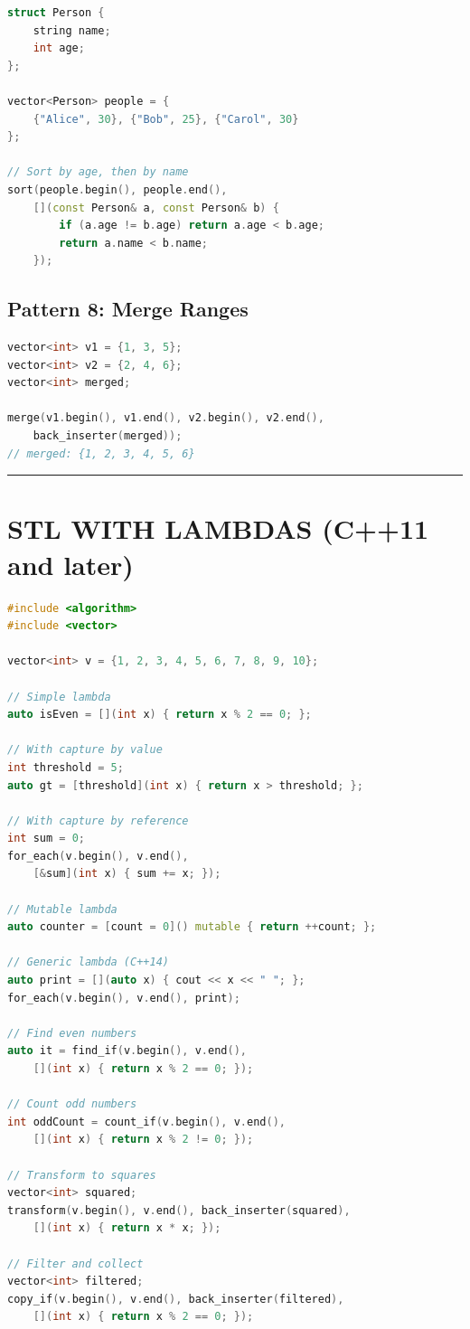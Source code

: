 \begin{lstlisting}[language={C++}]
struct Person {
    string name;
    int age;
};

vector<Person> people = {
    {"Alice", 30}, {"Bob", 25}, {"Carol", 30}
};

// Sort by age, then by name
sort(people.begin(), people.end(),
    [](const Person& a, const Person& b) {
        if (a.age != b.age) return a.age < b.age;
        return a.name < b.name;
    });
\end{lstlisting}

\hypertarget{pattern-8-merge-ranges}{%
\subsection{Pattern 8: Merge Ranges}\label{pattern-8-merge-ranges}}

\begin{lstlisting}[language={C++}]
vector<int> v1 = {1, 3, 5};
vector<int> v2 = {2, 4, 6};
vector<int> merged;

merge(v1.begin(), v1.end(), v2.begin(), v2.end(),
    back_inserter(merged));
// merged: {1, 2, 3, 4, 5, 6}
\end{lstlisting}

\begin{center}\rule{0.5\linewidth}{0.5pt}\end{center}

\hypertarget{stl-with-lambdas-c11-and-later}{%
\section{STL WITH LAMBDAS (C++11 and
later)}\label{stl-with-lambdas-c11-and-later}}

\begin{lstlisting}[language={C++}]
#include <algorithm>
#include <vector>

vector<int> v = {1, 2, 3, 4, 5, 6, 7, 8, 9, 10};

// Simple lambda
auto isEven = [](int x) { return x % 2 == 0; };

// With capture by value
int threshold = 5;
auto gt = [threshold](int x) { return x > threshold; };

// With capture by reference
int sum = 0;
for_each(v.begin(), v.end(),
    [&sum](int x) { sum += x; });

// Mutable lambda
auto counter = [count = 0]() mutable { return ++count; };

// Generic lambda (C++14)
auto print = [](auto x) { cout << x << " "; };
for_each(v.begin(), v.end(), print);

// Find even numbers
auto it = find_if(v.begin(), v.end(),
    [](int x) { return x % 2 == 0; });

// Count odd numbers
int oddCount = count_if(v.begin(), v.end(),
    [](int x) { return x % 2 != 0; });

// Transform to squares
vector<int> squared;
transform(v.begin(), v.end(), back_inserter(squared),
    [](int x) { return x * x; });

// Filter and collect
vector<int> filtered;
copy_if(v.begin(), v.end(), back_inserter(filtered),
    [](int x) { return x % 2 == 0; });
\end{lstlisting}

